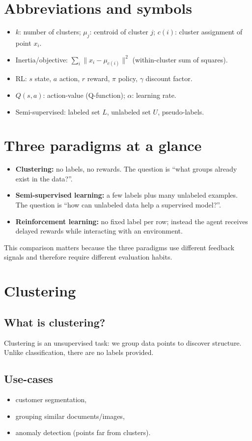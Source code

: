 \documentclass[11pt]{article}
\begin{document}
\section{Abbreviations and symbols}
\begin{itemize}[leftmargin=*]
  \item $k$: number of clusters; $\mu_j$: centroid of cluster $j$; $c(i)$: cluster assignment of point $x_i$.
  \item Inertia/objective: $\sum_i \|x_i-\mu_{c(i)}\|^2$ (within-cluster sum of squares).
  \item RL: $s$ state, $a$ action, $r$ reward, $\pi$ policy, $\gamma$ discount factor.
  \item $Q(s,a)$: action-value (Q-function); $\alpha$: learning rate.
  \item Semi-supervised: labeled set $L$, unlabeled set $U$, pseudo-labels.
\end{itemize}

\section{Three paradigms at a glance}
\begin{itemize}[leftmargin=*]
  \item \textbf{Clustering:} no labels, no rewards. The question is ``what groups already exist in the data?''.
  \item \textbf{Semi-supervised learning:} a few labels plus many unlabeled examples. The question is ``how can unlabeled data help a supervised model?''.
  \item \textbf{Reinforcement learning:} no fixed label per row; instead the agent receives delayed rewards while interacting with an environment.
\end{itemize}
This comparison matters because the three paradigms use different feedback signals and therefore require different evaluation habits.

\section{Clustering}
\subsection{What is clustering?}
Clustering is an unsupervised task: we group data points to discover structure.
Unlike classification, there are no labels provided.

\subsection{Use-cases}
\begin{itemize}[leftmargin=*]
  \item customer segmentation,
  \item grouping similar documents/images,
  \item anomaly detection (points far from clusters).
\end{itemize}
\end{document}
